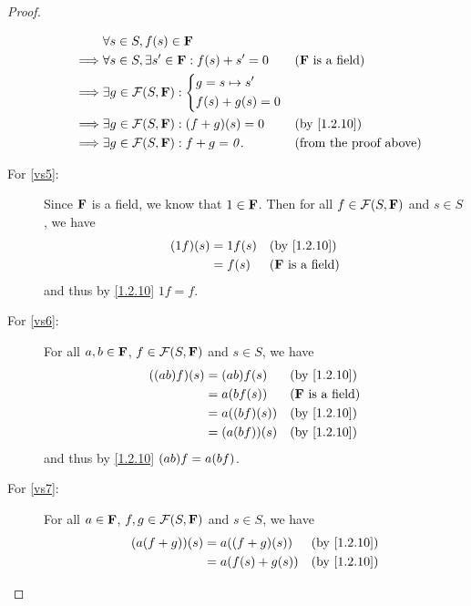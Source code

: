 \begin{proof}
\begin{description}
\begin{align*}
                 & \forall s \in S, f\p{s} \in \F                                                          \\
        \implies & \forall s \in S, \exists s' \in \F : f\p{s} + s' = 0 &  & \text{(\(\F\) is a field)}    \\
        \implies & \exists g \in \FS : \begin{dcases}
          g = s \mapsto s' \\
          f\p{s} + g\p{s} = 0
        \end{dcases}                                          \\
        \implies & \exists g \in \FS : \p{f + g}\p{s} = 0               &  & \text{(by \cref{1.2.10})}     \\
        \implies & \exists g \in \FS : f + g = \zv.                     &  & \text{(from the proof above)}
      \end{align*}
    \item[For \ref{vs5}:]
      Since \(\mathbf{F}\) is a field, we know that \(1 \in \mathbf{F}\).
      Then for all \(f \in \FS\) and \(s \in S\), we have
      \begin{align*}
        \p{1f}\p{s} & = 1f\p{s} &  & \text{(by \cref{1.2.10})}  \\
                    & = f\p{s}  &  & \text{(\(\F\) is a field)}
      \end{align*}
      and thus by \cref{1.2.10} \(1f = f\).
    \item[For \ref{vs6}:]
      For all \(a, b \in \mathbf{F}\), \(f \in \FS\) and \(s \in S\), we have
      \begin{align*}
        \p{\p{ab} f}\p{s} & = \p{ab} f\p{s}     &  & \text{(by \cref{1.2.10})}  \\
                          & = a \p{b f\p{s}}    &  & \text{(\(\F\) is a field)} \\
                          & = a \p{\p{bf}\p{s}} &  & \text{(by \cref{1.2.10})}  \\
                          & = \p{a \p{bf}}\p{s} &  & \text{(by \cref{1.2.10})}
      \end{align*}
      and thus by \cref{1.2.10} \(\p{ab} f = a \p{bf}\).
    \item[For \ref{vs7}:]
      For all \(a \in \mathbf{F}\), \(f, g \in \FS\) and \(s \in S\), we have
      \begin{align*}
        \p{a \p{f + g}}\p{s} & = a \p{\p{f + g}\p{s}}      &  & \text{(by \cref{1.2.10})}  \\
                             & = a \p{f\p{s} + g\p{s}}     &  & \text{(by \cref{1.2.10})}  \\

\end{align*}
\end{description}
\end{proof}
